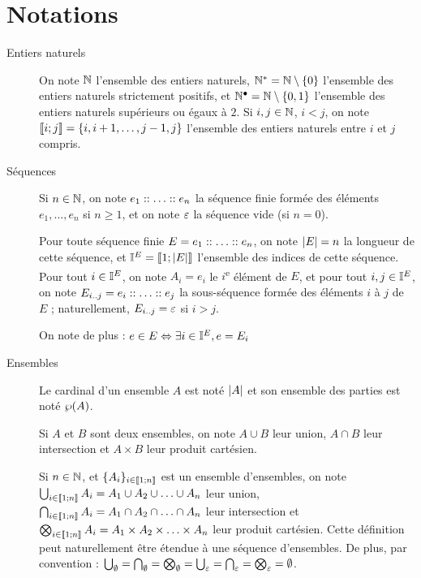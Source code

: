 \section{Notations}

\begin{description}
  \item[Entiers naturels]
    On note $\mathbb{N}$ l'ensemble des entiers naturels,
    $\mathbb{N}^* = \mathbb{N} \setminus \{ 0 \}$ l'ensemble des entiers naturels strictement positifs,
    et $\mathbb{N}^\bullet = \mathbb{N} \setminus \{ 0, 1 \}$ l'ensemble des entiers naturels
    supérieurs ou égaux à $2$.
    Si $i, j \in \mathbb{N}$, $i < j$, on note $\llbracket i; j \rrbracket = \{ i, i+1, \ldots, j-1, j \}$
    l'ensemble des entiers naturels entre $i$ et $j$ compris.
  
  \item[Séquences]
    Si $n \in \mathbb{N}$, on note $e_1 :: \ldots :: e_n$ la séquence finie formée
    des éléments $e_1, \ldots, e_n$ si $n \geq 1$,
    et on note $\varepsilon$ la séquence vide (si $n = 0$).
    
    Pour toute séquence finie $E = e_1 :: \ldots :: e_n$,
    on note $|E| = n$ la longueur de cette séquence,
    et $\mathbb{I}^{E} = \llbracket 1; |E| \rrbracket$ l'ensemble des indices de cette séquence.
    Pour tout $i \in \mathbb{I}^{E}$, on note $A_i = e_i$ le $i$\textsuperscript{e} élément de $E$,
    et pour tout $i,j \in \mathbb{I}^{E}$, on note $E_{i..j} = e_i :: \ldots :: e_j$
    la sous-séquence formée des éléments $i$ à $j$ de $E$ ;
    naturellement, $E_{i..j} = \varepsilon$ si $i > j$.
    
    On note de plus : $e \in E \Leftrightarrow \exists i \in \mathbb{I}^{E}, e = E_i$
  
  \item[Ensembles]
    Le cardinal d'un ensemble $A$ est noté $|A|$
    et son ensemble des parties est noté $\wp(A)$.
    
    Si $A$ et $B$ sont deux ensembles, on note
    $A \cup B$ leur union, $A \cap B$ leur intersection et $A \times B$ leur produit cartésien.
    
    Si $n \in \mathbb{N}$, et $\{ A_i \}_{i \in \llbracket 1; n \rrbracket}$ est un ensemble d'ensembles, on note
    $\bigcup_{i \in \llbracket 1; n \rrbracket} A_i = A_1 \cup A_2 \cup \ldots \cup A_n$ leur union,
    $\bigcap_{i \in \llbracket 1; n \rrbracket} A_i = A_1 \cap A_2 \cap \ldots \cap A_n$ leur intersection et
    $\bigotimes_{i \in \llbracket 1; n \rrbracket} A_i = A_1 \times A_2 \times \ldots \times A_n$
    leur produit cartésien.
    Cette définition peut naturellement être étendue à une séquence d'ensembles.
    De plus, par convention :
    $\bigcup_{\emptyset} = \bigcap_{\emptyset} = \bigotimes_{\emptyset} =
      \bigcup_{\varepsilon} = \bigcap_{\varepsilon} = \bigotimes_{\varepsilon} = \emptyset$.
    

\end{description}
